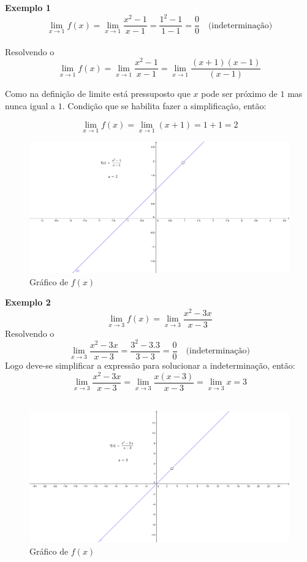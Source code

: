 \textbf{Exemplo 1} $$ \lim_{x \to 1} f(x) = \lim_{x \to 1} \frac{x^2 -1}{x-1} = \frac{1^2 - 1}{1-1} = \frac{0}{0} \quad \textrm{(indeterminação)}$$\\
Resolvendo o $$\lim_{x \to 1} f(x) =\lim_{x \to 1}  \frac{x^2-1}{x-1} = \lim_{x \to 1} \frac{(x+1)(x-1)}{(x-1)}$$

Como na definição de limite está pressuposto que $x$ pode ser próximo de $1$ mas nunca igual a $1$. Condição que se habilita fazer a simplificação, então:

$$\lim_{x \to 1} f(x) =\lim_{x \to 1} (x+1) = 1+ 1= 2$$
\begin{figure}[H]
\centering %
\includegraphics[width=15cm]{img/graph6.png} %
\caption{Gráfico de $f(x)$}
\label{fig:graph6}
\end{figure}

\textbf{Exemplo 2} $$\lim_{x \to 3} f(x) = \lim_{x \to 3} \frac{x^2-3x}{x-3}$$ Resolvendo o $$\displaystyle \lim_{x \to 3}  \frac{x^2-3x}{x-3} = \frac{3^2 - 3 . 3}{3-3}= \frac{0}{0} \quad \textrm{(indeterminação)}$$  Logo deve-se simplificar a expressão para solucionar a  indeterminação, então:
$$\lim_{x \to 3} \frac{x^2 - 3x}{x-3} = \lim_{x \to 3} \frac{x(x-3)}{x-3}= \lim_{x \to 3} x = 3$$\\

\begin{figure}[H]
\centering %
\includegraphics[width=15cm]{img/graph7.png} %
\caption{Gráfico de $f(x)$}
\label{fig:graph7}
\end{figure}

